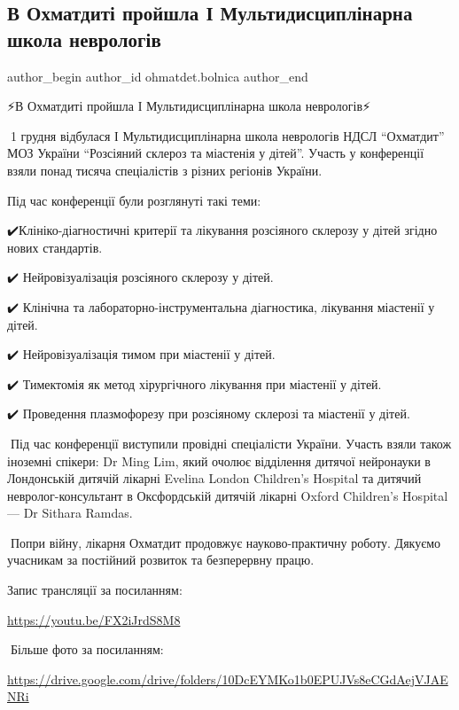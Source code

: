  
 
 
 
 
 
\subsection{В Охматдиті пройшла І Мультидисциплінарна школа неврологів}
\label{sec:05_12_2022.fb.ohmatdet.bolnica.1.shkola_nevrologia}
 
\ifcmt
 author_begin
   author_id ohmatdet.bolnica
 author_end
\fi

⚡️В Охматдиті пройшла І Мультидисциплінарна школа неврологів⚡️

🔻1 грудня відбулася І Мультидисциплінарна школа неврологів НДСЛ \enquote{Охматдит} МОЗ
України \enquote{Розсіяний склероз та міастенія у дітей}. Участь у конференції взяли
понад тисяча спеціалістів з різних регіонів України. 

Під час конференції були розглянуті такі теми: 

✔️Клініко-діагностичні критерії та лікування розсіяного склерозу у дітей згідно нових стандартів.\par
✔️ Нейровізуалізація розсіяного склерозу у дітей.\par
✔️ Клінічна та лабораторно-інструментальна діагностика, лікування міастенії у дітей.\par
✔️ Нейровізуалізація тимом при міастенії у дітей.\par
✔️ Тимектомія як метод хірургічного лікування при міастенії у дітей.\par
✔️ Проведення плазмофорезу при розсіяному склерозі та міастенії у дітей.\par

🔻Під час конференції виступили провідні спеціалісти України. Участь взяли
також іноземні спікери: Dr Ming Lim, який очолює відділення дитячої нейронауки
в Лондонській дитячій лікарні Evelina London Children's Hospital та дитячий
невролог-консультант в Оксфордській дитячій лікарні Oxford Children's Hospital
— Dr Sithara Ramdas.

🔻Попри війну, лікарня Охматдит продовжує науково-практичну роботу. Дякуємо
учасникам за постійний розвиток та безперервну працю. 

Запис трансляції за посиланням:

\url{https://youtu.be/FX2iJrdS8M8}

📸Більше фото за посиланням:

\url{https://drive.google.com/drive/folders/10DcEYMKo1b0EPUJVs8eCGdAejVJAENRi}

